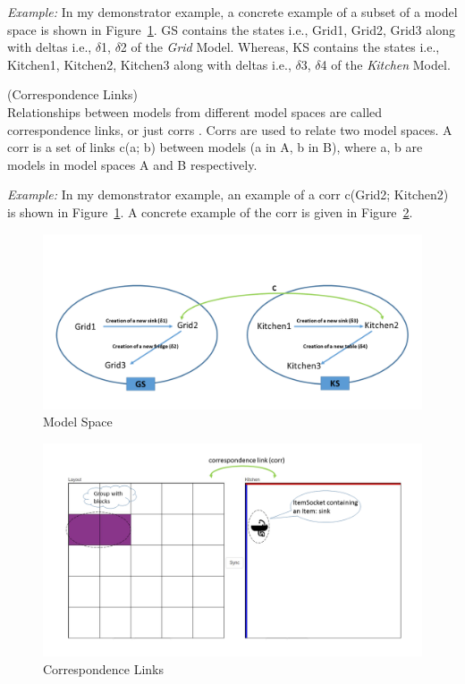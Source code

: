\textit{Example:} In my demonstrator example, a concrete example of a subset of a model space is shown in Figure~\ref{fig:Model_Space}. GS contains the states i.e., Grid1, Grid2, Grid3 along with deltas i.e., $\delta$1, $\delta$2 of the \textit{Grid} Model. Whereas, KS contains the states i.e., Kitchen1, Kitchen2, Kitchen3 along with deltas i.e., $\delta$3, $\delta$4 of the \textit{Kitchen} Model.

\begin{defn}\label{defCorrespondenceLinks } (Correspondence Links)\\
Relationships between models from different model spaces are called correspondence links, or just corrs \cite{benchmarx-reload}. Corrs are used to relate two model spaces. A corr is a set of links c(a; b) between models (a in A, b in B), where  a, b are models in model spaces A and B respectively.
\end{defn}

\textit{Example:} In my demonstrator example, an example of a corr c(Grid2; Kitchen2) is shown in Figure~\ref{fig:Model_Space}. A concrete example of the corr is given in  Figure~\ref{fig:Correspondence_Links}.

\begin{figure}
	\centering
	\includegraphics[width=1\textwidth]{figures/Model_Space}
	\caption{Model Space}
	\label{fig:Model_Space}
\end{figure}

\begin{figure}
	\centering
	\includegraphics[width=1\textwidth]{figures/Corr}
	\caption{Correspondence Links}
	\label{fig:Correspondence_Links}
\end{figure}

